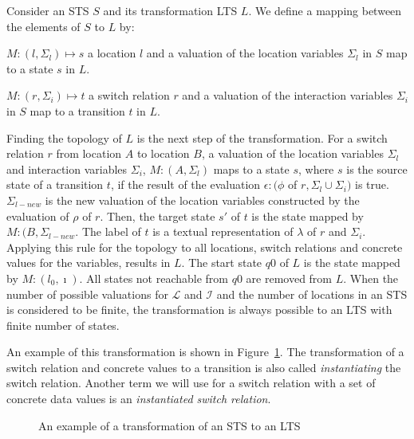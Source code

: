 Consider an STS $S$ and its transformation LTS $L$. We define a mapping between the elements of $S$ to $L$ by:
\begin{definition}
  \item $M:(l, \Sigma_l) \mapsto s$ a location $l$ and a valuation of the location variables $\Sigma_l$ in $S$ map to a state $s$ in $L$.
  \item $M:(r, \Sigma_i) \mapsto t$ a switch relation $r$ and a valuation of the interaction variables $\Sigma_i$ in $S$ map to a transition $t$ in $L$.
\end{definition}
Finding the topology of $L$ is the next step of the transformation. For a switch relation $r$ from location $A$ to location $B$, a valuation of the location variables $\Sigma_l$ and interaction variables $\Sigma_i$, $M:(A,\Sigma_l)$ maps to a state $s$, where $s$ is the source state of a transition $t$, if the result of the evaluation $\epsilon:(\phi$ of $r, \Sigma_l \cup \Sigma_i)$ is true. $\Sigma_{l-new}$ is the new valuation of the location variables constructed by the evaluation of $\rho$ of $r$. Then, the target state $s'$ of $t$ is the state mapped by $M:(B,\Sigma_{l-new}$. The label of $t$ is a textual representation of $\lambda$ of $r$ and $\Sigma_i$. Applying this rule for the topology to all locations, switch relations and concrete values for the variables, results in $L$. The start state $q0$ of $L$ is the state mapped by $M:(l_0,\imath)$. All states not reachable from $q0$ are removed from $L$. When the number of possible valuations for $\mathcal{L}$ and $\mathcal{I}$ and the number of locations in an STS is considered to be finite, the transformation is always possible to an LTS with finite number of states.

An example of this transformation is shown in Figure~\ref{fig:example_trafo}. The transformation of a switch relation and concrete values to a transition is also called \textit{instantiating} the switch relation. Another term we will use for a switch relation with a set of concrete data values is an \textit{instantiated switch relation}.

\begin{figure}[h]
  \begin{center}
    \hspace{20px}
  \end{center}
  \caption{An example of a transformation of an STS to an LTS}
  \label{fig:example_trafo}
\end{figure}

